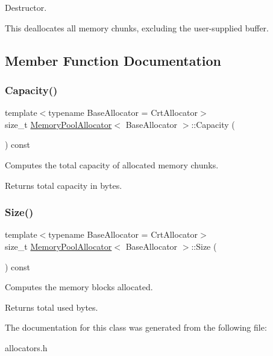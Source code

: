 Destructor. 

This deallocates all memory chunks, excluding the user-\/supplied buffer. 

\subsection{Member Function Documentation}
\mbox{\label{a01984_a5672e0833fda2e71ce987911397489ed}} 
\subsubsection{\texorpdfstring{Capacity()}{Capacity()}}
{\footnotesize\ttfamily template$<$typename Base\+Allocator = Crt\+Allocator$>$ \\
size\+\_\+t \hyperlink{a01984}{Memory\+Pool\+Allocator}$<$ Base\+Allocator $>$\+::Capacity (\begin{DoxyParamCaption}{ }\end{DoxyParamCaption}) const\hspace{0.3cm}{\ttfamily [inline]}}



Computes the total capacity of allocated memory chunks. 

\begin{DoxyReturn}{Returns}
total capacity in bytes. 
\end{DoxyReturn}
\mbox{\label{a01984_ae7fcf0341c13e899cf488bc7c8949956}} 
\subsubsection{\texorpdfstring{Size()}{Size()}}
{\footnotesize\ttfamily template$<$typename Base\+Allocator = Crt\+Allocator$>$ \\
size\+\_\+t \hyperlink{a01984}{Memory\+Pool\+Allocator}$<$ Base\+Allocator $>$\+::Size (\begin{DoxyParamCaption}{ }\end{DoxyParamCaption}) const\hspace{0.3cm}{\ttfamily [inline]}}



Computes the memory blocks allocated. 

\begin{DoxyReturn}{Returns}
total used bytes. 
\end{DoxyReturn}


The documentation for this class was generated from the following file\+:\begin{DoxyCompactItemize}
\item 
allocators.\+h\end{DoxyCompactItemize}
